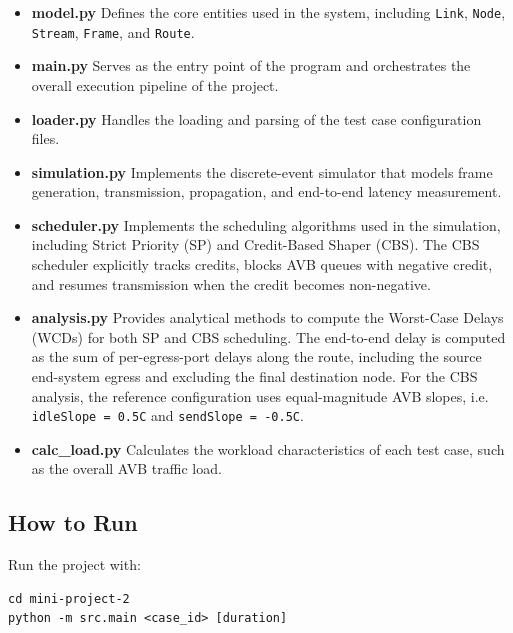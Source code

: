 \begin{itemize}

\item \textbf{model.py}
Defines the core entities used in the system, including \texttt{Link}, \texttt{Node}, \texttt{Stream}, \texttt{Frame}, and \texttt{Route}.

\item \textbf{main.py}
Serves as the entry point of the program and orchestrates the overall execution pipeline of the project.

\item \textbf{loader.py}
Handles the loading and parsing of the test case configuration files.

\item \textbf{simulation.py}
Implements the discrete-event simulator that models frame generation, transmission, propagation, and end-to-end latency measurement.

\item \textbf{scheduler.py}
Implements the scheduling algorithms used in the simulation, including Strict Priority (SP) and Credit-Based Shaper (CBS). The CBS scheduler explicitly tracks credits, blocks AVB queues with negative credit, and resumes transmission when the credit becomes non-negative.

\item \textbf{analysis.py}
Provides analytical methods to compute the Worst-Case Delays (WCDs) for both SP and CBS scheduling. The end-to-end delay is computed as the sum of per-egress-port delays along the route, including the source end-system egress and excluding the final destination node. For the CBS analysis, the reference configuration uses equal-magnitude AVB slopes, i.e. \texttt{idleSlope = 0.5C} and \texttt{sendSlope = -0.5C}.

\item \textbf{calc\_load.py}
Calculates the workload characteristics of each test case, such as the overall AVB traffic load.

\end{itemize}

\subsection{How to Run}
Run the project with:

\begin{verbatim}
cd mini-project-2
python -m src.main <case_id> [duration]
\end{verbatim}

